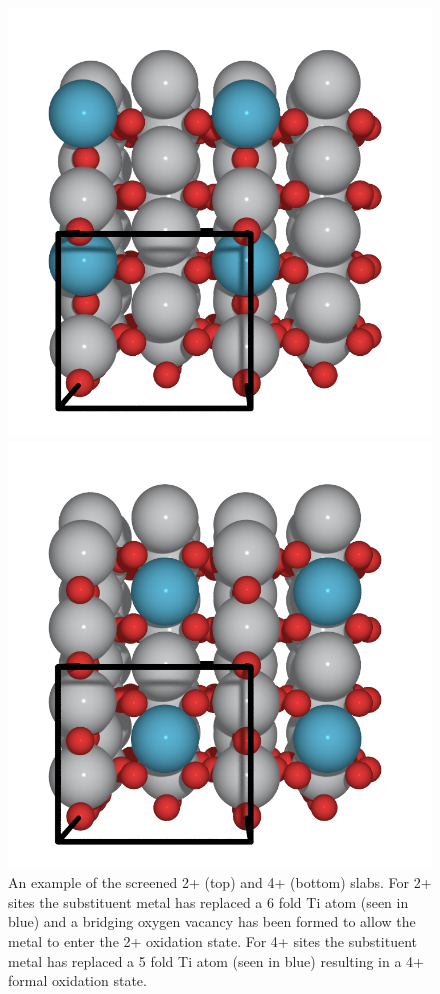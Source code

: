 \begin{figure}
    \centering
    \includegraphics[width=0.7\linewidth]{Images/ex_2+_slab.png}

    \centering
    \includegraphics[width=0.7\linewidth]{Images/ex_4+_slab.png}
    \caption{An example of the screened 2+ (top) and 4+ (bottom) slabs. For 2+ sites the substituent metal has replaced a 6 fold Ti atom (seen in blue) and a bridging oxygen vacancy has been formed to allow the metal to enter the 2+ oxidation state.  For 4+ sites the substituent metal has replaced a 5 fold Ti atom (seen in blue) resulting in a 4+ formal oxidation state.}%
    \label{fig:2ex_slab}
\end{figure}


